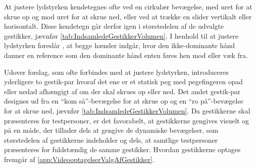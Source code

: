 \noindent
%
At justere lydstyrken kendetegnes ofte ved en cirkulær bevægelse, med uret for at skrue op og mod uret for at skrue ned, eller ved at trække en slider vertikalt eller horisontalt. Disse kendetegn går derfor igen i størstedelen af de udvalgte gestikker, jævnfør \autoref{tab:IndsamledeGestikkerVolumen}. I henhold til at justere lydstyrken foreslår \textcite[s. 48]{PDF:UserDefinedGesturesTV}, at begge hænder indgår, hvor den ikke-dominante hånd danner en reference som den dominante hånd enten føres hen mod eller væk fra.

Udover forslag, som ofte forbindes med at justere lydstyrken, introduceres yderligere to gestik-par hvoraf det ene er et statisk peg med pegefingeren opad eller nedad afhængigt af om der skal skrues op eller ned. Det andet gestik-par designes ud fra en \enquote{kom så}-bevægelse for at skrue op og en \enquote{ro på}-bevægelse for at skrue ned, jævnfør \autoref{tab:IndsamledeGestikkerVolumen}. \blankline
%
Da gestikkerne skal præsenteres for testpersoner, er det favorabelt, at gestikkerne gengives visuelt og på en måde, der tillader dels at gengive de dynamiske bevægelser, som størstedelen af gestikkerne indeholder og dels, at samtlige testpersoner præsenteres for fuldstændig de samme gestikker. Hvordan gestikkerne optages fremgår af \autoref{app:VideooptagelserValgAfGestikker}.
%

